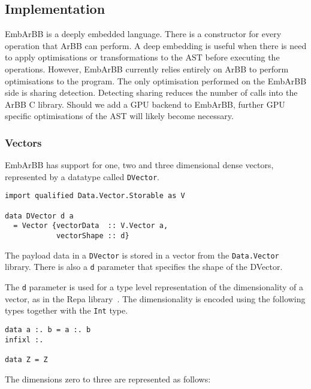 

\subsection{Implementation} 
EmbArBB is a deeply embedded language. There is a constructor for 
every operation that ArBB can perform. A deep embedding is useful when 
there is need to apply optimisations or transformations to the AST before 
executing the operations. However, EmbArBB currently relies entirely on 
ArBB to perform optimisations to the program. The only optimisation 
performed on the EmbArBB side is sharing detection. Detecting sharing 
reduces the number of calls into the ArBB C library. Should we add a 
GPU backend to EmbArBB, further GPU specific optimisations of the AST 
will likely become necessary. 
 

\subsubsection{Vectors} 
EmbArBB has support for one, two and three dimensional dense vectors,
represented by a datatype called {\tt DVector}. 

\begin{verbatim}
import qualified Data.Vector.Storable as V

data DVector d a 
  = Vector {vectorData  :: V.Vector a, 
            vectorShape :: d} 
\end{verbatim}  

The payload data in a {\tt DVector} is stored in a vector from the 
{\tt Data.Vector} library. There is also a {\tt d} parameter that specifies 
the shape of the DVector. 


The {\tt d} parameter is used for a type level representation of the 
dimensionality of a vector, as in the Repa library~. The 
dimensionality is encoded using the following types together with 
the {\tt Int} type. 

\begin{verbatim} 
data a :. b = a :. b  
infixl :. 

data Z = Z 
\end{verbatim} 

The dimensions zero to three are represented as follows:

